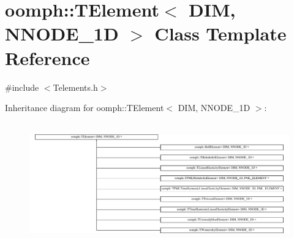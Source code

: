 \hypertarget{classoomph_1_1TElement}{}\section{oomph\+:\+:T\+Element$<$ D\+IM, N\+N\+O\+D\+E\+\_\+1D $>$ Class Template Reference}
\label{classoomph_1_1TElement}


{\ttfamily \#include $<$Telements.\+h$>$}

Inheritance diagram for oomph\+:\+:T\+Element$<$ D\+IM, N\+N\+O\+D\+E\+\_\+1D $>$\+:\begin{figure}[H]
\begin{center}
\leavevmode
\includegraphics[height=5.283019cm]{classoomph_1_1TElement}
\end{center}
\end{figure}
